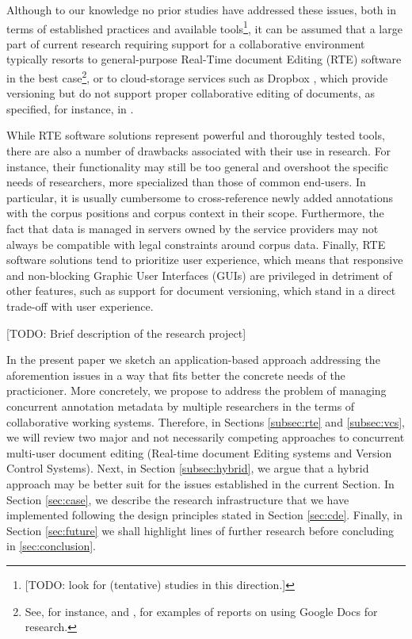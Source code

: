 \documentclass{sig-alternate}
\begin{document}
Although to our knowledge no prior studies have addressed these issues, both in terms of
established practices and available tools\footnote{
  [TODO: look for (tentative) studies in this direction.]
}, it can be assumed that a large part of current research requiring support for a
collaborative environment typically resorts to general-purpose Real-Time document Editing
(RTE) software in the best case\footnote{
  See, for instance, \cite{Rowlands2011} and \cite{Wood2011}, for examples of reports on
  using Google Docs for research.
}, or to cloud-storage services \textemdash such as Dropbox \cite{Dropboxa} \textemdash,
which provide versioning but do not support proper collaborative editing of documents,
as specified, for instance, in \cite{Dropbox}.

While RTE software solutions represent powerful and thoroughly tested tools, there are also
a number of drawbacks associated with their use in research.
For instance, their functionality may still be too general and overshoot the specific needs of
researchers, more specialized than those of common end-users. In particular, it is usually
cumbersome to cross-reference newly added annotations with the corpus positions and corpus
context in their scope.
Furthermore, the fact that data is managed in servers owned by the service providers may not
always be compatible with legal constraints around corpus data.
Finally, RTE software solutions tend to prioritize user experience, which means that
responsive and non-blocking Graphic User Interfaces (GUIs) are privileged in detriment of
other features, such as support for document versioning, which stand in a direct trade-off
with user experience.

[TODO: Brief description of the research project]

In the present paper we sketch an application-based approach addressing the aforemention
issues in a way that fits better the concrete needs of the practicioner.
More concretely, we propose to address the problem of managing concurrent annotation
metadata by multiple researchers in the terms of collaborative working systems.
Therefore, in Sections \ref{subsec:rte} and \ref{subsec:vcs}, we will review two major and
not necessarily competing approaches to concurrent multi-user document editing
(Real-time document Editing systems and Version Control Systems).
Next, in Section \ref{subsec:hybrid}, we argue that a hybrid approach may be better suit for
the issues established in the current Section.
In Section \ref{sec:case}, we describe the research infrastructure that we have implemented
following the design principles stated in Section \ref{sec:cde}.
Finally, in Section \ref{sec:future} we shall highlight lines of further research before
concluding in \ref{sec:conclusion}.
\end{document}
